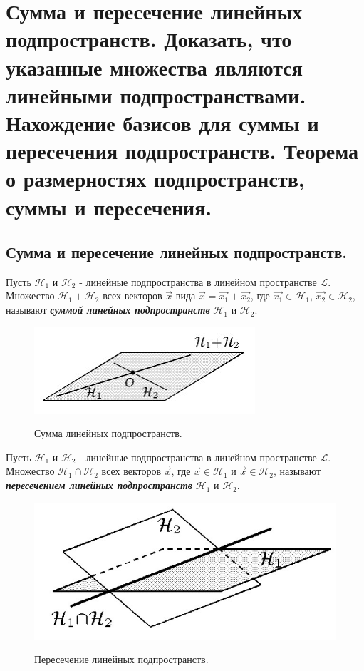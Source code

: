 \section{
    Сумма и пересечение линейных подпространств. Доказать, что указанные множества являются линейными подпространствами. Нахождение базисов для суммы и пересечения подпространств. Теорема о размерностях подпространств, суммы и пересечения.
}

\subsection{
    Сумма и пересечение линейных подпространств.
}   

\begin{definition}
    Пусть $\mathcal{H}_1$ и $\mathcal{H}_2$ - линейные подпространства в линейном пространстве $\mathcal{L}$. Множество $\mathcal{H}_1 + \mathcal{H}_2$ всех векторов $\vec{x}$ вида $\vec{x} = \vec{x_1} + \vec{x_2}$, где $\vec{x_1} \in \mathcal{H}_1$, $\vec{x_2} \in \mathcal{H}_2$, называют \textbf{\textit{суммой линейных подпространств}} $\mathcal{H}_1$ и $\mathcal{H}_2$. 
\end{definition}

\begin{figure}[H]
    \centering
    \includegraphics[scale=0.7]{images/4_1.jpg}
    \label{fig:picture_4_1}
    \caption{Сумма линейных подпространств.}
\end{figure}

\begin{definition}
    Пусть $\mathcal{H}_1$ и $\mathcal{H}_2$ - линейные подпространства в линейном пространстве $\mathcal{L}$. Множество $\mathcal{H}_1 \cap \mathcal{H}_2$ всех векторов $\vec{x}$, где $\vec{x} \in \mathcal{H}_1$ и $\vec{x} \in \mathcal{H}_2$, называют \textbf{\textit{пересечением линейных подпространств}} $\mathcal{H}_1$ и $\mathcal{H}_2$.
\end{definition}

\begin{figure}[H]
    \centering
    \includegraphics[scale=0.4]{images/4_2.jpg}
    \label{fig:picture_4_2}
    \caption{Пересечение линейных подпространств.}
\end{figure}


